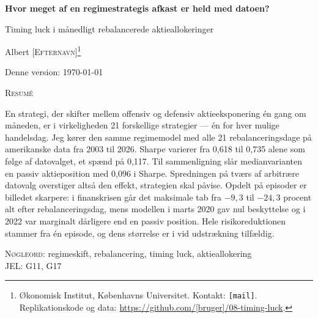 \documentclass[11pt,a4paper]{article}
\begin{document}
\thispagestyle{empty}

\begin{center}
  {\Large\bfseries Hvor meget af en regimestrategis afkast er held med datoen?\par}
  \vspace{0.3em}
  {\large Timing luck i månedligt rebalancerede aktieallokeringer\par}
  \vspace{1.4em}
  {\large Albert \textsc{[Efternavn]}\footnote{Økonomisk Institut,
   Københavns Universitet. Kontakt: \texttt{[mail]}. Replikationskode og data:
   \url{https://github.com/[bruger]/08-timing-luck}.}\par}
  \vspace{0.8em}
  {\normalsize Denne version: \today\par}
\end{center}

\vspace{1.2em}
\begin{center}\begin{minipage}{0.85\textwidth}\small
\begin{center}\textsc{Resumé}\end{center}
\noindent
En strategi, der skifter mellem offensiv og defensiv aktieeksponering én gang
om måneden, er i virkeligheden 21 forskellige strategier --- én for hver
mulige handelsdag. Jeg kører den samme regimemodel med alle 21
rebalanceringsdage på amerikanske data fra 2003 til 2026. Sharpe varierer fra
0,618 til 0,735 alene som følge af datovalget, et spænd på 0,117. Til
sammenligning slår medianvarianten en passiv aktieposition med 0,096 i Sharpe.
Spredningen på tværs af arbitrære datovalg overstiger altså den effekt,
strategien skal påvise. Opdelt på episoder er billedet skarpere: i finanskrisen
går det maksimale tab fra $-9{,}3$ til $-24{,}3$ procent alt efter
rebalanceringsdag, mens modellen i marts 2020 gav nul beskyttelse og i 2022 var
marginalt dårligere end en passiv position. Hele risikoreduktionen stammer fra
én episode, og dens størrelse er i vid udstrækning tilfældig.
\end{minipage}\end{center}

\vspace{0.8em}
\begin{center}\begin{minipage}{0.85\textwidth}\small
\noindent\textsc{Nøgleord:} regimeskift, rebalancering, timing luck, aktieallokering\\
\noindent\textsc{JEL:} G11, G17
\end{minipage}\end{center}
\end{document}
